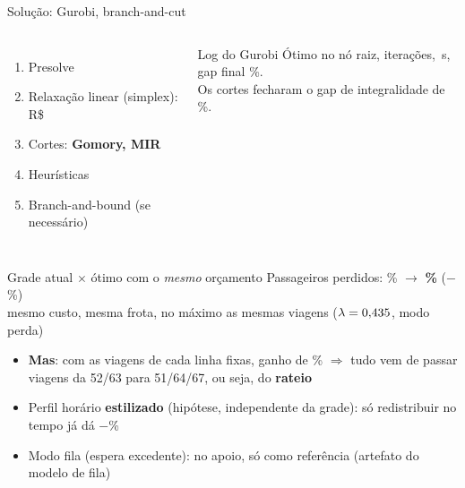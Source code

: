 \documentclass[aspectratio=169,11pt]{beamer}
\newcommand{\destaque}[1]{{\color{azul}\textbf{#1}}}
\begin{document}
\begin{frame}{Solução: Gurobi, branch-and-cut}
\begin{columns}[T]
\begin{enumerate}\small
\item Presolve
\item Relaxação linear (simplex): R\$~\Zrelax
\item Cortes: \destaque{\cortesGomory{} Gomory, \cortesMIR{} MIR}
\item Heurísticas
\item Branch-and-bound (se necessário)
\end{enumerate}
\begin{block}{Log do Gurobi \versaoGurobi}
\small Ótimo no nó raiz, \iteracoesSimplex{} iterações, \tempoSolucao\,s, gap final \gapFinal\%.\\[3pt]
Os cortes fecharam o gap de integralidade de \gapInt\%.
\end{block}
\end{columns}
\end{frame}

\begin{frame}{Grade atual $\times$ ótimo com o \emph{mesmo} orçamento}
\centering
{\Large Passageiros perdidos: \moPctGTFS\% $\rightarrow$ \destaque{\moPctOtimo\%} ($-$\moReducaoPerda\%)}\\[0.2em]
{\small mesmo custo, mesma frota, no máximo as mesmas \viagensGTFS{} viagens ($\lambda=0{,}435$, modo perda)}\\[0.7em]
\resizebox{0.78\linewidth}{!}{}
\vspace{0.5em}
\begin{itemize}\small
\item \destaque{Mas}: com as viagens de cada linha fixas, ganho de \moReducaoPerdaFixa\% $\Rightarrow$ tudo vem de passar viagens da 52/63 para 51/64/67, ou seja, do \destaque{rateio}
\item Perfil horário \destaque{estilizado} (hipótese, independente da grade): só redistribuir no tempo já dá $-$\moReducaoTipicoFixa\%
\item Modo fila (espera excedente): no apoio, só como referência (artefato do modelo de fila)
\end{itemize}
\end{frame}
\end{document}
